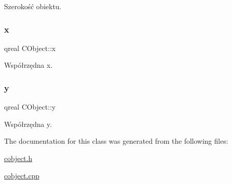 Szerokość obiektu. 

\mbox{\label{class_c_object_acb23178c7b65e6cf37f9ab95128cd8d2}} 
\subsubsection{\texorpdfstring{x}{x}}
{\footnotesize\ttfamily qreal C\+Object\+::x\hspace{0.3cm}{\ttfamily [protected]}}



Współrzędna x. 

\mbox{\label{class_c_object_a22fd03bdf2bc5c7058e4c2a9c9237c64}} 
\subsubsection{\texorpdfstring{y}{y}}
{\footnotesize\ttfamily qreal C\+Object\+::y\hspace{0.3cm}{\ttfamily [protected]}}



Współrzędna y. 



The documentation for this class was generated from the following files\+:\begin{DoxyCompactItemize}
\item 
\mbox{\hyperlink{cobject_8h}{cobject.\+h}}\item 
\mbox{\hyperlink{cobject_8cpp}{cobject.\+cpp}}\end{DoxyCompactItemize}
